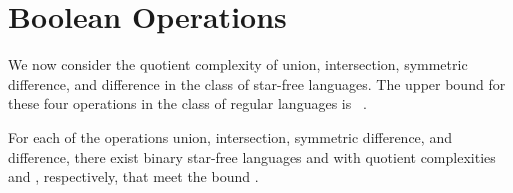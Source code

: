 \documentclass{llncs}
\begin{document}
\section{Boolean Operations}
\label{sec:boolean}
We now consider the quotient complexity of  union, intersection, symmetric difference, and difference in the class of star-free languages. 
The upper bound for these four operations in the class of regular languages is ~\cite{Brz10,Mas70,YZS94}.



\begin{theorem}
\label{thm:boolean}
For each of the operations  union, intersection, symmetric difference, and difference, there exist binary star-free languages  and  with quotient complexities  and , respectively, that meet the bound .
\end{theorem}
\end{document}
